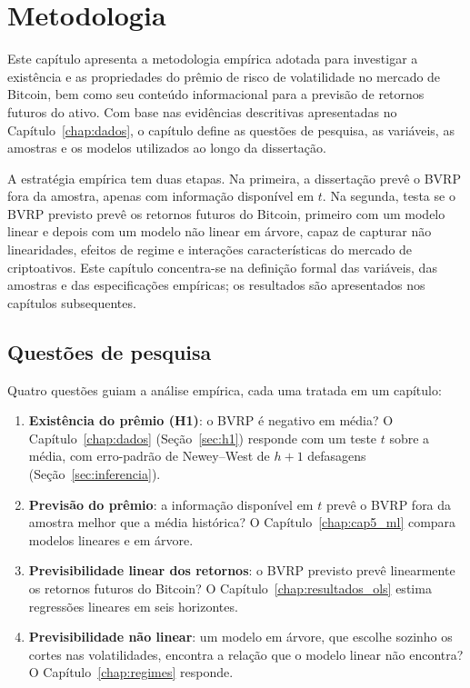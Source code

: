 \chapter{Metodologia}
\label{chap:metodologia}

Este capítulo apresenta a metodologia empírica adotada para investigar a
existência e as propriedades do prêmio de risco de volatilidade no mercado de
Bitcoin, bem como seu conteúdo informacional para a previsão de retornos futuros
do ativo. Com base nas evidências descritivas apresentadas no
Capítulo~\ref{chap:dados}, o capítulo define as questões de pesquisa, as
variáveis, as amostras e os modelos utilizados ao longo da dissertação.

A estratégia empírica tem duas etapas. Na primeira, a dissertação prevê o BVRP
fora da amostra, apenas com informação disponível em $t$. Na segunda, testa se
o BVRP previsto prevê os retornos futuros do Bitcoin, primeiro com um modelo
linear e depois com um modelo não linear em árvore, capaz de capturar
não linearidades, efeitos de regime e interações características do mercado de
criptoativos. Este capítulo concentra-se na definição formal das variáveis, das
amostras e das especificações empíricas; os resultados são apresentados nos
capítulos subsequentes.

\section{Questões de pesquisa}
\label{sec:hipoteses}

Quatro questões guiam a análise empírica, cada uma tratada em um capítulo:

\begin{enumerate}
    \item \textbf{Existência do prêmio (H1)}: o BVRP é negativo em média? O
          Capítulo~\ref{chap:dados} (Seção~\ref{sec:h1}) responde com um teste
          $t$ sobre a média, com erro-padrão de Newey--West de $h+1$
          defasagens (Seção~\ref{sec:inferencia}).
    \item \textbf{Previsão do prêmio}: a informação disponível em $t$ prevê o
          BVRP fora da amostra melhor que a média histórica? O
          Capítulo~\ref{chap:cap5_ml} compara modelos lineares e em árvore.
    \item \textbf{Previsibilidade linear dos retornos}: o BVRP previsto prevê
          linearmente os retornos futuros do Bitcoin? O
          Capítulo~\ref{chap:resultados_ols} estima regressões lineares em seis
          horizontes.
    \item \textbf{Previsibilidade não linear}: um modelo em árvore, que escolhe
          sozinho os cortes nas volatilidades, encontra a relação que o modelo
          linear não encontra? O Capítulo~\ref{chap:regimes} responde.
\end{enumerate}

